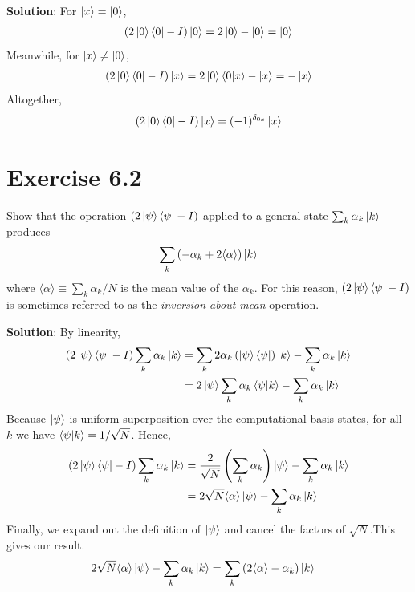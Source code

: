 \documentclass{book}
\begin{document}
    \textbf{Solution}: For $\ket{x} = \ket{0}$,
    \begin{align}
        (2\ket{0}\bra{0}-I)\ket{0} = 2\ket{0}-\ket{0} = \ket{0}
    \end{align}
    Meanwhile, for $\ket{x} \neq \ket{0}$,
    \begin{align}
        (2\ket{0}\bra{0}-I)\ket{x} = 2\ket{0}\braket{0}{x}-\ket{x} = -\ket{x}
    \end{align}
    Altogether,
    \begin{align}
        (2\ket{0}\bra{0}-I)\ket{x} = (-1)^{\delta_{0x}}\ket{x}
    \end{align}

\section*{Exercise 6.2}
    Show that the operation $(2\ket{\psi}\bra{\psi}-I)$ applied to a general state $\sum_k \alpha_k \ket{k}$ produces
    \begin{align}
        \sum_k \left(-\alpha_k+2\langle\alpha\rangle\right)\ket{k}
    \end{align}
    where $\langle\alpha\rangle \equiv \sum_k\alpha_k/N$ is the mean value of the $\alpha_k$. For this reason, $(2\ket{\psi}\bra{\psi}-I)$ is sometimes referred to as the \emph{inversion about mean} operation.
    
    \textbf{Solution}: By linearity,
    \begin{align*}
        (2\ket{\psi}\bra{\psi}-I)\sum_k \alpha_k\ket{k} &= \sum_k 2 \alpha_k\left(\ket{\psi}\bra{\psi}\right)\ket{k} - \sum_k \alpha_k\ket{k} \\
        &= 2\ket{\psi}\sum_k\alpha_k\braket{\psi}{k}-\sum_k\alpha_k\ket{k}
    \end{align*}
    Because $\ket{\psi}$ is uniform superposition over the computational basis states, for all $k$ we have $\braket{\psi}{k}=1/\sqrt{N}$. Hence,
    \begin{align}
    (2\ket{\psi}\bra{\psi}-I)\sum_k \alpha_k\ket{k} &= \frac{2}{\sqrt{N}}\left(\sum_k\alpha_k\right)\ket{\psi} - \sum_k \alpha_k\ket{k} \\
    &= 2\sqrt{N} \langle\alpha\rangle\ket{\psi} - \sum_k\alpha_k\ket{k}
    \end{align}
    Finally, we expand out the definition of $\ket{\psi}$ and cancel the factors of $\sqrt{N}$.This gives our result. 
    \begin{align}
        2\sqrt{N} \langle\alpha\rangle\ket{\psi} - \sum_k\alpha_k\ket{k} &= \sum_k\left(2\langle\alpha\rangle-\alpha_k\right)\ket{k}
    \end{align}
\end{document}
